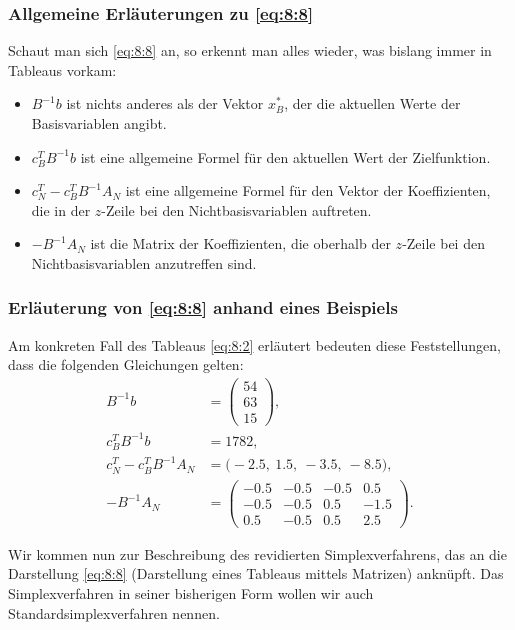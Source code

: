 \documentclass[smaller]{beamer}
\begin{document}
\begin{frame}
 \frametitle{Allgemeine Erläuterungen zu \eqref{eq:8:8}}
  Schaut man sich \eqref{eq:8:8} an, so erkennt man alles wieder, was bislang immer in Tableaus vorkam:
\begin{itemize}
\item $B^{-1}b$ ist nichts anderes als der Vektor $x_B^*$, der die aktuellen Werte der Basisvariablen angibt.
\item $c_B^TB^{-1}b$ ist eine allgemeine Formel für den aktuellen Wert der Zielfunktion.
\item $c_N^T - c_B^TB^{-1}A_N$ ist eine allgemeine Formel für den Vektor der Koeffizienten, die in der $z$-Zeile bei den Nichtbasisvariablen auftreten.
\item $-B^{-1}A_N$ ist die Matrix der Koeffizienten, die oberhalb der $z$-Zeile bei den Nichtbasisvariablen anzutreffen sind.
\end{itemize}
\end{frame}

\begin{frame}
 \frametitle{Erläuterung von \eqref{eq:8:8} anhand eines Beispiels}
 Am konkreten Fall des Tableaus \eqref{eq:8:2} erläutert bedeuten diese Feststellungen, dass die folgenden Gleichungen gelten:
\begin{align*}
B^{-1}b &= \begin{pmatrix} 54 \\ 63 \\ 15 \end{pmatrix}, \\
c_B^TB^{-1}b &= 1782, \\[2mm]
c_N^T - c_B^TB^{-1}A_N &= \big( -2.5,\ 1.5,\ -3.5,\ -8.5\big), \\
-B^{-1}A_N &= \left(\begin{array}{rrrr}
-0.5 & -0.5 & -0.5 & 0.5 \\ -0.5 & -0.5 & 0.5 & -1.5 \\ 0.5 & -0.5 & 0.5 &  2.5
\end{array}\right).
\end{align*}

Wir kommen nun zur \alert{Beschreibung des revidierten Simplexverfahrens}, das an die Darstellung \eqref{eq:8:8} ({\glqq}Darstellung eines Tableaus mittels Matrizen{\grqq}) anknüpft. Das Simplexverfahren in seiner bisherigen Form wollen wir auch \alert{Standardsimplexverfahren} nennen.
\end{frame}
\end{document}
